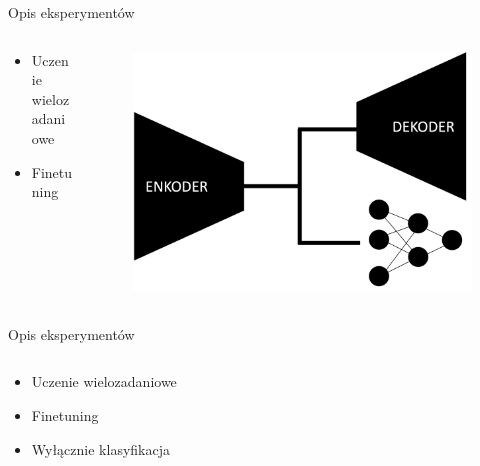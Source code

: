 \documentclass[10pt]{beamer}
\begin{document}
\begin{frame}{Opis eksperymentów}
    \begin{columns}
        \begin{column}{0.5\textwidth}
            \begin{itemize}
               \item Uczenie wielozadaniowe
               \item Finetuning
            \end{itemize}
        \end{column}

        \begin{column}{0.5\textwidth}
            \begin{figure}
                \includegraphics[width=\textwidth]{images/archs/multitask.png}
            \end{figure}
        \end{column}
    \end{columns}
\end{frame}\begin{frame}{Opis eksperymentów}
    \begin{columns}
        \begin{column}{0.5\textwidth}
            \begin{itemize}
               \item Uczenie wielozadaniowe
               \item Finetuning
               \item Wyłącznie klasyfikacja
            \end{itemize}
        \end{column}


\end{columns}
\end{frame}
\end{document}
